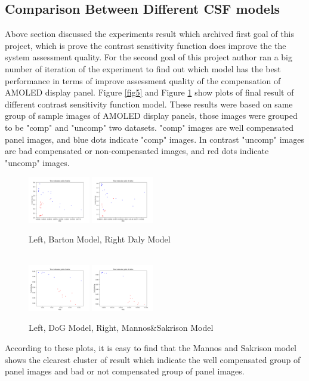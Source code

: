 \documentclass{article}
\begin{document}
\subsection{Comparison Between Different CSF models}
Above section discussed the experiments result which archived first goal of this project, which is prove the contrast sensitivity function does improve the the system assessment quality. For the second goal of this project author ran a big number of iteration of the experiment to find out which model has the best performance in terms of improve assessment quality of the compensation of AMOLED display panel. Figure \ref{fig5} and Figure \ref{fig6} show plots of final result of different contrast sensitivity function model. These results were based on same group of sample images of AMOLED display panels, those images were grouped to be "comp" and "uncomp" two datasets. "comp" images are well compensated panel images, and blue dots indicate "comp" images. In contrast "uncomp" images are bad compensated or non-compensated images, and red dots indicate "uncomp" images.
\begin{figure}[h]
    \centering
    \includegraphics[width=0.24\textwidth]{images/BartonCSFed_D_1_4_G_01r_23b_result.png}\hfill
    \includegraphics[width=0.24\textwidth]{images/DalyCSFed_D_1_8_G_01r_23b_result.png}\hfill
    \label{fig5}
    \caption{ Left, Barton Model, Right Daly Model }
    \\[\smallskipamount]
    \includegraphics[width=0.24\textwidth]{images/NewDoG_Streched_CSFed_A1_G_01r_23b_result.png}\hfill
    \includegraphics[width=0.24\textwidth]{images/MS_STRECH_CSFED_G_A1_01r_23b_result.png}\hfill
    \caption{ Left, DoG Model,  Right, Mannos&Sakrison Model }
    \label{fig6}
\end{figure}
According to these plots, it is easy to find that the Mannos and Sakrison model shows the clearest cluster of result which indicate the well compensated group of panel images and bad or not compensated group of panel images.
\end{document}
